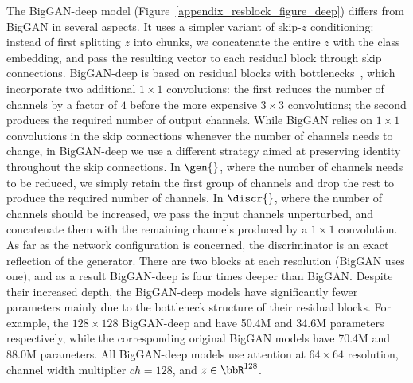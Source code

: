 The BigGAN-deep model (Figure~\ref{appendix_resblock_figure_deep}) differs from BigGAN in several aspects.
It uses a simpler variant of skip-$z$ conditioning: instead of first splitting $z$ into chunks, we concatenate the entire $z$ with the class embedding, and pass the resulting vector to each residual block through skip connections.
BigGAN-deep is based on residual blocks with bottlenecks~\citep{he2016resnets}, which incorporate two additional $1 \times 1$ convolutions: the first reduces the number of channels by a factor of $4$ before the more expensive $3 \times 3$ convolutions; the second produces the required number of output channels. 
While BigGAN relies on $1\times 1$ convolutions in the skip connections whenever the number of channels needs to change, in BigGAN-deep we use a different strategy aimed at preserving identity throughout the skip connections. In $\gen{}$, where the number of channels needs to be reduced, we simply retain the first group of channels and drop the rest to produce the required number of channels. In $\discr{}$, where the number of channels should be increased, we pass the input channels unperturbed, and concatenate them with the remaining channels produced by a $1 \times 1$ convolution.
As far as the network configuration is concerned, the discriminator is an exact reflection of the generator. There are two blocks at each resolution (BigGAN uses one), and as a result BigGAN-deep is four times deeper than BigGAN. 
Despite their increased depth, the BigGAN-deep models have significantly fewer parameters mainly due to the bottleneck structure of their residual blocks.
For example, the $128\times128$ BigGAN-deep \gen{} and \discr{} have 50.4M and 34.6M parameters respectively, while the corresponding original BigGAN models have 70.4M and 88.0M parameters.
All BigGAN-deep models use attention at $64 \times 64$ resolution, channel width multiplier $ch=128$, and $z\in \bbR^{128}$.

